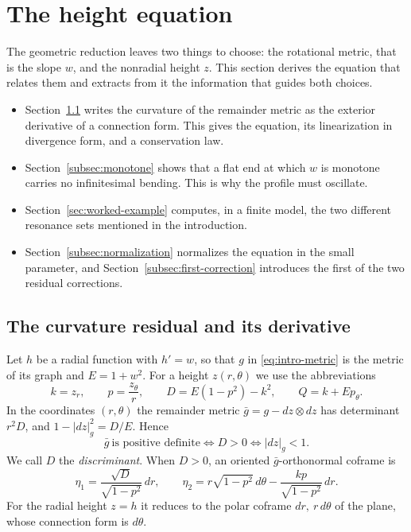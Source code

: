 \section{The height equation}
\label{sec:scalar-core}

The geometric reduction leaves two things to choose: the rotational
metric, that is the slope $w$, and the nonradial height $z$. This
section derives the equation that relates them and extracts from it
the information that guides both choices.
\begin{itemize}
\item Section~\ref{subsec:residual} writes the curvature of the
 remainder metric as the exterior derivative of a connection form.
 This gives the equation, its linearization in divergence form, and a
 conservation law.
\item Section~\ref{subsec:monotone} shows that a flat end at which $w$
 is monotone carries no infinitesimal bending. This is why the profile
 must oscillate.
\item Section~\ref{sec:worked-example} computes, in a finite model, the
 two different resonance sets mentioned in the introduction.
\item Section~\ref{subsec:normalization} normalizes the equation in
 the small parameter, and Section~\ref{subsec:first-correction}
 introduces the first of the two residual corrections.
\end{itemize}

\subsection{The curvature residual and its derivative}
\label{subsec:residual}

Let $h$ be a radial function with $h'=w$, so that $g$ in
\eqref{eq:intro-metric} is the metric of its graph and $E=1+w^2$. For
a height $z(r,\theta)$ we use the abbreviations
\begin{equation}\label{eq:height-jet-notation}
 k=z_r,\qquad p=\frac{z_\theta}{r},\qquad
 D=E(1-p^2)-k^2,\qquad Q=k+Ep_\theta .
\end{equation}
In the coordinates $(r,\theta)$ the remainder metric
$\bar g=g-dz\otimes dz$ has determinant $r^2D$, and
$1-|dz|_g^2=D/E$. Hence
\[
 \bar g\ \text{is positive definite}
 \iff D>0\iff |dz|_g<1 .
\]
We call $D$ the \emph{discriminant}. When $D>0$, an oriented
$\bar g$-orthonormal coframe is
\[
 \eta_1=\frac{\sqrt D}{\sqrt{1-p^2}}\,dr,\qquad
 \eta_2=r\sqrt{1-p^2}\,d\theta-\frac{kp}{\sqrt{1-p^2}}\,dr .
\]
For the radial height $z=h$ it reduces to the polar coframe
$dr,\ r\,d\theta$ of the plane, whose connection form is $d\theta$.

